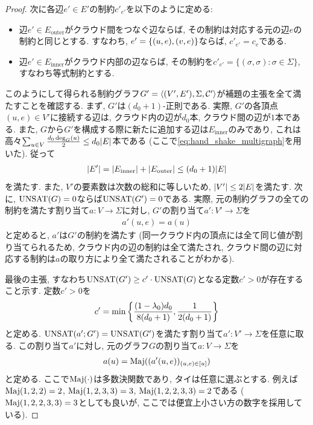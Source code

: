 \begin{proof}
次に各辺$e'\in E'$の制約$c'_{e'}$を以下のように定める:
\begin{itemize}
\item 辺$e'\in E_{\mathrm{outer}}$がクラウド間をつなぐ辺ならば, その制約は対応する元の辺$e$の制約と同じとする.
すなわち, $e'=\qty{ (u,e), (v,e) }$ならば, $c'_{e'}=c_e$である.
\item 辺$e'\in E_{\mathrm{inner}}$がクラウド内部の辺ならば, その制約を$c'_{e'}=\{(\sigma,\sigma)\colon \sigma\in\Sigma\}$, すなわち等式制約とする.
\end{itemize}

このようにして得られる制約グラフ$G'=\langle(V',E'),\Sigma,\mathcal{C}'\rangle$が補題の主張を全て満たすことを確認する.
まず, $G'$は$(d_0+1)$-正則である.
実際, $G'$の各頂点$(u,e)\in V'$に接続する辺は, クラウド内の辺が$d_0$本, クラウド間の辺が$1$本である.
また, $G$から$G'$を構成する際に新たに追加する辺は$E_{\mathrm{inner}}$のみであり, これは高々$\sum_{u\in V}\frac{d_0\deg_G(u)}{2} \le d_0\abs{E}$本である (ここで\cref{eq:hand_shake_multigraph}を用いた).
従って
\begin{align}
  \abs{E'} = \abs{E_{\mathrm{inner}}} + \abs{E_{\mathrm{outer}}} \le \qty(d_0+1)\abs{E} \label{eq:bound_of_E'}
\end{align}
を満たす.
また, $V'$の要素数は次数の総和に等しいため, $\abs{V'}\le 2\abs{E}$を満たす.
次に, $\mathrm{UNSAT}(G)=0$ならば$\mathrm{UNSAT}(G')=0$である.
実際, 元の制約グラフの全ての制約を満たす割り当て$a\colon V\to\Sigma$に対し, $G'$の割り当て$a'\colon V'\to\Sigma$を
\begin{align*}
  a'(u,e) = a(u)
\end{align*}
と定めると, $a'$は$G'$の制約を満たす (同一クラウド内の頂点には全て同じ値が割り当てられるため, クラウド内の辺の制約は全て満たされ, クラウド間の辺に対応する制約は$a$の取り方により全て満たされることがわかる).

最後の主張, すなわち$\mathrm{UNSAT}(G') \ge c'\cdot \mathrm{UNSAT}(G)$となる定数$c'>0$が存在すること示す.
定数$c'>0$を
\begin{align}
  c' = \min\qty{\frac{(1-\lambda_0)d_0}{8(d_0+1)}, \frac{1}{2(d_0+1)}} \label{eq:c_of_degree_reduction}
\end{align}
と定める.
$\mathrm{UNSAT}(a';G')=\mathrm{UNSAT}(G')$を満たす割り当て$a'\colon V'\to\Sigma$を任意に取る.
この割り当て$a'$に対し, 元のグラフ$G$の割り当て$a\colon V\to\Sigma$を
\begin{align*}
  a(u) = \mathrm{Maj}((a'(u,e))_{(u,e) \in [u]})
\end{align*}
と定める. ここで$\mathrm{Maj}(\cdot)$は多数決関数であり,
タイは任意に選ぶとする.
例えば$\mathrm{Maj}(1,2,2)=2$, $\mathrm{Maj}(1,2,3,3)=3$, $\mathrm{Maj}(1,2,2,3,3)=2$である ($\mathrm{Maj}(1,2,2,3,3)=3$としても良いが, ここでは便宜上小さい方の数字を採用している).


\end{proof}
